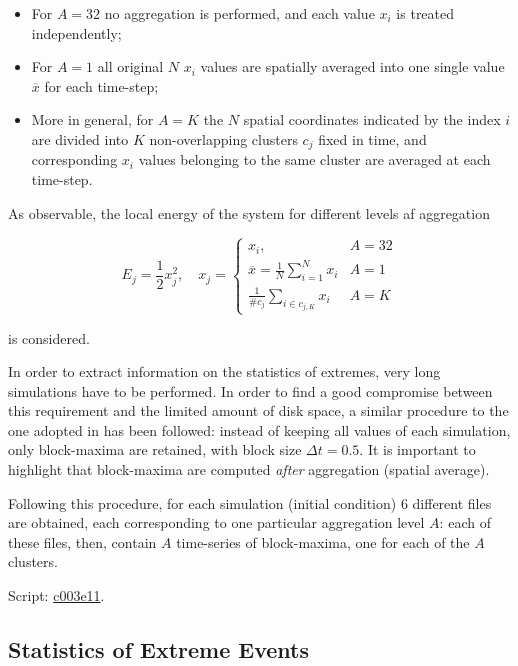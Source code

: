 \documentclass{article}
\begin{document}
\begin{itemize}
	\item For $A=32$ no aggregation is performed, and each value $x_i$ is treated independently;
	\item For $A=1$ all original $N$ $x_i$ values are spatially averaged into one single value $\overline{x}$ for each time-step;
	\item More in general, for $A=K$ the $N$ spatial coordinates indicated by the index $i$ are divided into $K$ non-overlapping clusters $c_j$ fixed in time, and corresponding $x_i$ values belonging to the same cluster are averaged at each time-step.
\end{itemize}

As observable, the local energy of the system for different levels af aggregation

\begin{equation}
E_j=\frac{1}{2}x_j^2, \quad x_j=
	\begin{cases}
   		x_i, & A=32\\
   		\overline{x} = \frac{1}{N} \sum_{i=1}^{N} x_i & A=1 \\
		\frac{1}{\#c_j} \sum_{i \in c_{j, K}} x_i & A=K
	\end{cases}
\end{equation}

is considered.

In order to extract information on the statistics of extremes, very long simulations have to be performed. In order to find a good compromise between this requirement and the limited amount of disk space, a similar procedure to the one adopted in \cite{Galfi} has been followed: instead of keeping all values of each simulation, only block-maxima are retained, with block size $\Delta t = 0.5$. It is important to highlight that block-maxima are computed \textit{after} aggregation (spatial average).

Following this procedure, for each simulation (initial condition) 6 different files are obtained, each corresponding to one particular aggregation level $A$: each of these files, then, contain $A$ time-series of block-maxima, one for each of the $A$ clusters.

Script: \href{https://github.com/marco-cucchi/L96gev/commit/f3614ce9369484bc5d1f06613fbea6fe26a7dd87#diff-bdb8a6ca7f3a8d1a4753b03a3b753204}{c003e11}.

\subsection{Statistics of Extreme Events}
\label{subsec:StatExtrEv}
\end{document}
